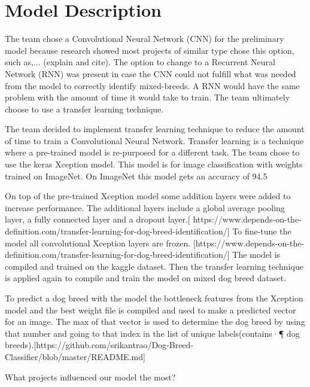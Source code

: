 \documentclass[12pt]{report}
\begin{document}
\section* {Model Description}
\indent \par
\par The team chose a Convolutional Neural Network (CNN) for the preliminary model because research showed most projects of similar type chose this option, such as,... (explain and cite). The option to change to a Recurrent Neural Network (RNN) was present in case the CNN could not fulfill what was needed from the model to correctly identify mixed-breeds. A RNN would have the same problem with the amount of time it would take to train. The team ultimately choose to use a transfer learning technique.
\par The team decided to implement transfer learning technique to reduce the amount of time to train a Convolutional Neural Network. Transfer learning is a technique where a pre-trained model is re-purposed for a different task. The team chose to use the keras Xception model. This model is for image classification with weights trained on ImageNet. On ImageNet this model gets an accuracy of 94.5%
\par On top of the pre-trained Xception model some addition layers were added to increase performance. The additional layers include a global average pooling layer, a fully connected layer and a dropout layer.[ https://www.depends-on-the-definition.com/transfer-learning-for-dog-breed-identification/] To fine-tune the model all convolutional Xception layers are frozen. [https://www.depends-on-the-definition.com/transfer-learning-for-dog-breed-identification/] The model is compiled and trained on the kaggle dataset. Then the transfer learning technique is applied again to compile and train the model on mixed dog breed dataset.
\par To predict a dog breed with the model the bottleneck features from the Xception model and the best weight file is compiled and used to make a predicted vector for an image. The max of that vector is used to determine the dog breed by using that number and going to that index in the list of unique labels(contains·¶ dog breeds).[https://github.com/srikantrao/Dog-Breed-Classifier/blob/master/README.md]
\par \par What projects influenced our model the most? 
\end{document}
